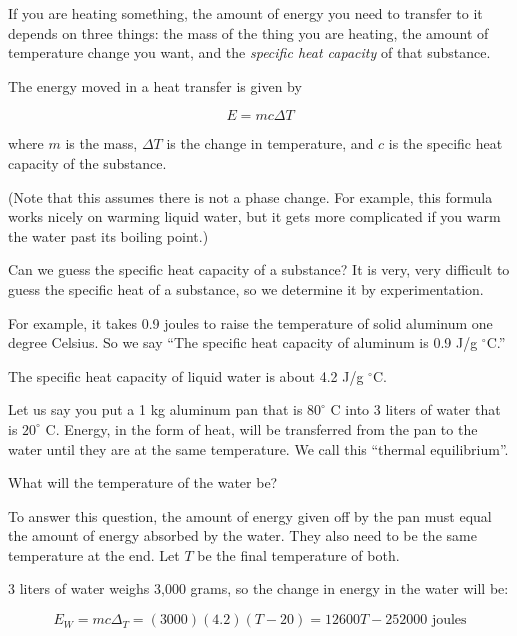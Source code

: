 If you are heating something, the amount of energy you need to
transfer to it depends on three things: the mass of the thing you are
heating, the amount of temperature change you want, and the
\textit{specific heat capacity} of that substance.

\begin{mdframed}[style=important, frametitle={Energy in Heat Transfer}]

  The energy moved in a heat transfer is given by

  $$E = m c \Delta T$$


  where $m$ is the mass, $\Delta T$ is the change in temperature, and
  $c$ is the specific heat capacity of the substance.

  (Note that this
  assumes there is not a phase change. For example, this formula works nicely on
  warming liquid water, but it gets more complicated if you warm the
  water past its boiling point.)

\end{mdframed}

Can we guess the specific heat capacity of a substance? It is very,
very difficult to guess the specific heat of a substance, so we determine
it by experimentation.

For example, it takes 0.9 joules to raise
the temperature of solid aluminum one degree Celsius. So we say ``The
specific heat capacity of aluminum is 0.9 J/g $^\circ$C.''

The specific heat capacity of liquid water is about 4.2 J/g $^\circ$C.

Let us say you put a 1 kg aluminum pan that is $80^\circ$ C into
3 liters of water that is $20^\circ$ C. Energy, in the form of heat,
will be transferred from the pan to the water until they are at the same
temperature. We call this ``thermal equilibrium''.

What will the temperature of the water be?

To answer this question, the amount of energy given off by the
pan must equal the amount of energy absorbed by the water. They also
need to be the same temperature at the end. Let $T$ be the final
temperature of both.

3 liters of water weighs 3,000 grams, so the
change in energy in the water will be:

$$E_W = m c \Delta_T = (3000)(4.2)(T - 20) = 12600T - 252000 \text{ joules}$$

